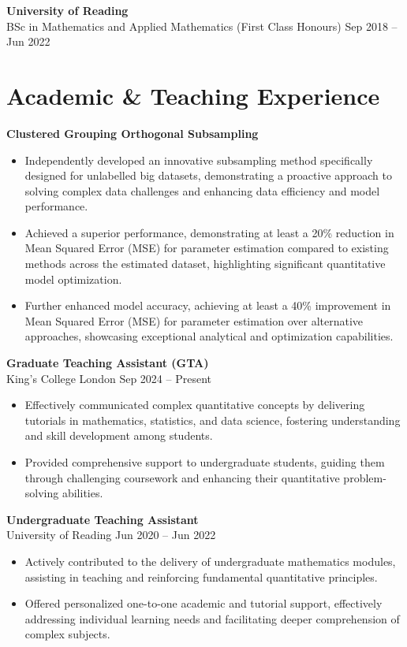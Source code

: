 \documentclass[11pt,a4paper]{article}
\begin{document}
\textbf{University of Reading} \\
BSc in Mathematics and Applied Mathematics (First Class Honours) \hfill Sep 2018 -- Jun 2022

\section*{Academic \& Teaching Experience}
\quad \textbf{Clustered Grouping Orthogonal Subsampling} \\
\begin{itemize}
\item Independently developed an innovative subsampling method specifically designed for unlabelled big datasets, demonstrating a proactive approach to solving complex data challenges and enhancing data efficiency and model performance.
\item Achieved a superior performance, demonstrating at least a 20\% reduction in Mean Squared Error (MSE) for parameter estimation compared to existing methods across the estimated dataset, highlighting significant quantitative model optimization.
\item Further enhanced model accuracy, achieving at least a 40\% improvement in Mean Squared Error (MSE) for parameter estimation over alternative approaches, showcasing exceptional analytical and optimization capabilities.
\end{itemize}
\quad \textbf{Graduate Teaching Assistant (GTA)} \\
King’s College London \hfill Sep 2024 -- Present
\begin{itemize}
\item Effectively communicated complex quantitative concepts by delivering tutorials in mathematics, statistics, and data science, fostering understanding and skill development among students.
\item Provided comprehensive support to undergraduate students, guiding them through challenging coursework and enhancing their quantitative problem-solving abilities.
\end{itemize}

\textbf{Undergraduate Teaching Assistant} \\
University of Reading \hfill Jun 2020 -- Jun 2022
\begin{itemize}
\item Actively contributed to the delivery of undergraduate mathematics modules, assisting in teaching and reinforcing fundamental quantitative principles.
\item Offered personalized one-to-one academic and tutorial support, effectively addressing individual learning needs and facilitating deeper comprehension of complex subjects.
\end{itemize}
\end{document}
